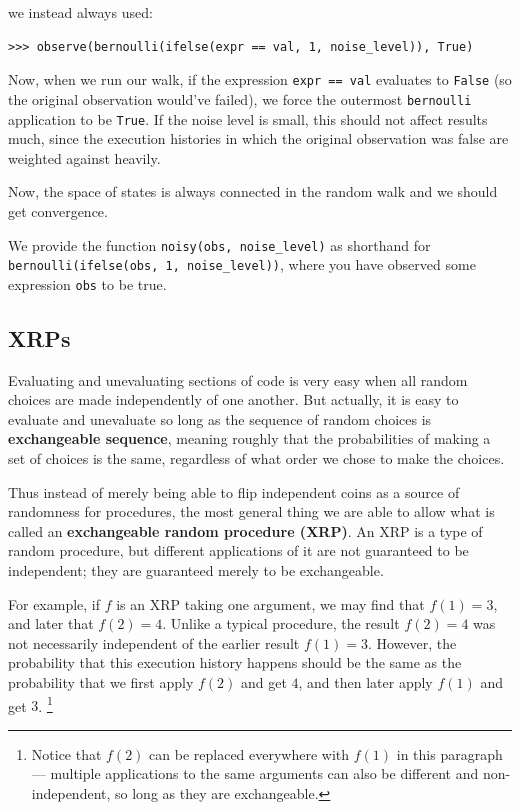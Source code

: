 \documentclass[11pt]{article}
\begin{document}
we instead always used:

\begin{small}
\begin{verbatim}
>>> observe(bernoulli(ifelse(expr == val, 1, noise_level)), True)
\end{verbatim}
\end{small}

Now, when we run our walk, if the expression {\tt expr == val} evaluates to {\tt False} (so the original observation would've failed), we force the outermost {\tt bernoulli} application to be {\tt True}.   If the noise level is small, this should not affect results much, since the execution histories in which the original observation was false are weighted against heavily.  

Now, the space of states is always connected in the random walk and we should get convergence.\vspace{6 pt}%

We provide the function {\tt noisy(obs, noise\_level)} as shorthand for {\tt bernoulli(ifelse(obs, 1, noise\_level))}, where you have observed some expression {\tt obs} to be true.  



\subsection{XRPs}

Evaluating and unevaluating sections of code is very easy when all random choices are made independently of one another.  But actually, it is easy to evaluate and unevaluate so long as the sequence of random choices is {\bf exchangeable sequence}, meaning roughly that the probabilities of making a set of choices is the same, regardless of what order we chose to make the choices.  

Thus instead of merely being able to flip independent coins as a source of randomness for procedures, the most general thing we are able to allow what is called an {\bf exchangeable random procedure (XRP)}.  An XRP is a type of random procedure, but different applications of it are not guaranteed to be independent; they are guaranteed merely to be exchangeable.  

For example, if $f$ is an XRP taking one argument, we may find that $f(1) = 3$, and later that $f(2) = 4$.  Unlike a typical procedure, the result $f(2) = 4$ was not necessarily independent of the earlier result $f(1) = 3$.  However, the probability that this execution history happens should be the same as the probability that we first apply $f(2)$ and get $4$, and then later apply $f(1)$ and get $3$.  \footnote{Notice that $f(2)$ can be replaced everywhere with $f(1)$ in this paragraph --- multiple applications to the same arguments can also be different and non-independent, so long as they are exchangeable.}  \\
\end{document}
